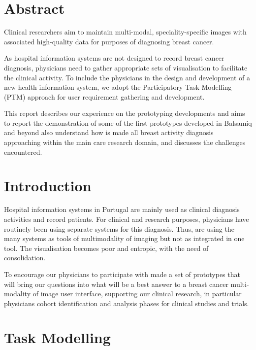 \section{Abstract}

Clinical researchers aim to maintain multi-modal, speciality-specific images with associated high-quality data for purposes of diagnosing breast cancer.

As hospital information systems are not designed to record breast cancer diagnosis, physicians need to gather appropriate sets of visualisation to facilitate the clinical activity. To include the physicians in the design and development of a new health information system, we adopt the Participatory Task Modelling (PTM) \cite{o2004participatory, keungparticipatory} approach for user requirement gathering and development.

This report describes our experience on the prototyping developments and aims to report the demonstration of some of the first prototypes developed in Balsamiq \cite{Balsamiq} and beyond also understand how is made all breast activity diagnosis approaching within the main care research domain, and discusses the challenges encountered.

\clearpage

\section{Introduction}

Hospital information systems in Portugal are mainly used as clinical diagnosis activities and record patients. For clinical and research purposes, physicians have routinely been using separate systems for this diagnosis. Thus, are using the many systems as tools of multimodality of imaging but not as integrated in one tool. The visualisation becomes poor and entropic, with the need of consolidation.

To encourage our physicians to participate with made a set of prototypes that will bring our questions into what will be a best answer to a breast cancer multi-modality of image user interface, supporting our clinical research, in particular physicians cohort identification and analysis phases for clinical studies and trials.

\clearpage

\section{Task Modelling}

